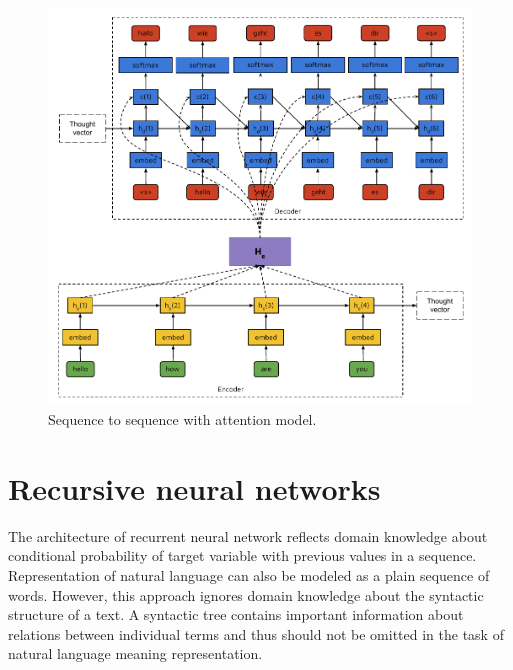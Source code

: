 \begin{figure}
\centering
\includegraphics{Figures/seq2seq}
\decoRule
\caption[Sequence to sequence model]{Sequence to sequence with attention model.}
\label{fig:seq2seq}
\end{figure}

\section{Recursive neural networks}

The architecture of recurrent neural network reflects domain knowledge about conditional probability of target variable with previous values in a sequence. Representation of natural language can also be modeled as a plain sequence of words. However, this approach ignores domain knowledge about the syntactic structure of a text. A syntactic tree contains important information about relations between individual terms and thus should not be omitted in the task of natural language meaning representation.

